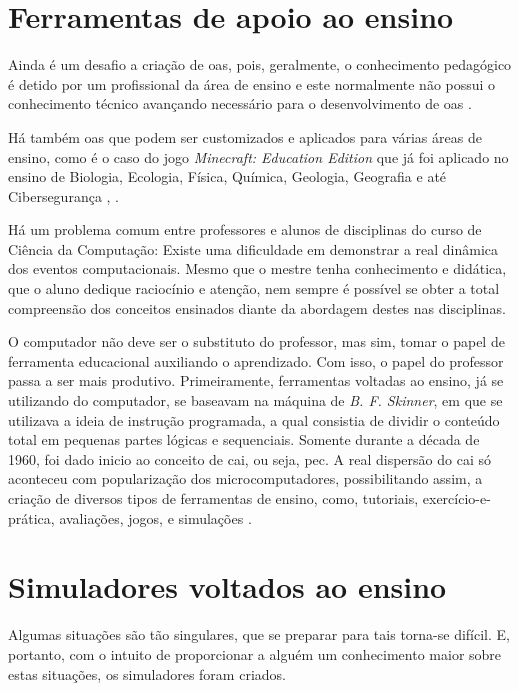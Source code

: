 \section{Ferramentas de apoio ao ensino}
\label{sec:ferramentaspoioensino}

Ainda é um desafio a criação de \acrshort{oa}s, pois, geralmente, o conhecimento pedagógico é detido por um profissional da área de ensino e este normalmente não possui o conhecimento técnico avançando necessário para o desenvolvimento de \acrshort{oa}s \cite{braga15}.

Há também \acrshort{oa}s que podem ser customizados e aplicados para várias áreas de ensino, como é o caso do jogo \textit{Minecraft: Education Edition} que já foi aplicado no ensino de Biologia, Ecologia, Física, Química, Geologia, Geografia \cite{short12} e até Cibersegurança \cite{geary19}, .

Há um problema comum entre professores e alunos de disciplinas do curso de Ciência da Computação: Existe uma dificuldade em demonstrar a real dinâmica dos eventos computacionais. Mesmo que o mestre tenha conhecimento e didática, que o aluno dedique raciocínio e atenção, nem sempre é possível se obter a total compreensão dos conceitos ensinados diante da abordagem destes nas disciplinas.

O computador não deve ser o substituto do professor, mas sim, tomar o papel de ferramenta educacional auxiliando o aprendizado. Com isso, o papel do professor passa a ser mais produtivo. Primeiramente, ferramentas voltadas ao ensino, já se utilizando do computador, se baseavam na máquina de \textit{B. F. Skinner}, em que se utilizava a ideia de instrução programada, a qual consistia de dividir o conteúdo total em pequenas partes lógicas e sequenciais. Somente durante a década de 1960, foi dado inicio ao conceito de \acrfull{cai}, ou seja, \acrfull{pec}. A real dispersão do \acrshort{cai} só aconteceu com popularização dos microcomputadores, possibilitando assim, a criação de diversos tipos de ferramentas de ensino, como, tutoriais, exercício-e-prática, avaliações, jogos, e simulações \cite{hamawaki09}.

\section{Simuladores voltados ao ensino}
\label{sec:simuladoresvoltadosensino}

Algumas situações são tão singulares, que se preparar para tais torna-se difícil. E, portanto, com o intuito de proporcionar a alguém um conhecimento maior sobre estas situações, os simuladores foram criados.

